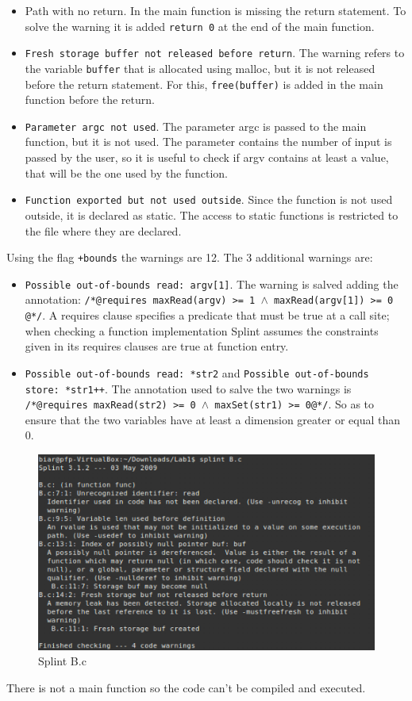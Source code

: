 \documentclass[a4paper]{article}
\begin{document}
\begin{itemize}
    \item \texttt{}{Path with no return}. In the main function is missing the return statement. To
        solve the warning it is added \texttt{return 0} at the end of the main function.

    \item \texttt{Fresh storage buffer not released before return}. The warning refers to the variable 
        \texttt{buffer} that is allocated using malloc, but it is not released before the return statement.
        For this, \texttt{free(buffer)} is added in the main function before the return.

    \item \texttt{Parameter argc not used}. The parameter argc is passed to the main function, but
        it is not used. The parameter contains the number of input is passed by the user, so it is useful
        to check if argv contains at least a value, that will be the one used by the function. 
    
    \item \texttt{Function exported but not used outside}. Since the function is not used outside, it
        is declared as static. The access to static functions is restricted to the file where they are declared.
\end{itemize}

Using the flag \texttt{+bounds} the warnings are 12. The 3 additional warnings are: 
\begin{itemize}
    \item \texttt{Possible out-of-bounds read: argv[1]}. The warning is salved adding the annotation: 
        \texttt{/*@requires maxRead(argv) >= 1 $\wedge$ maxRead(argv[1]) >= 0 @*/}. A requires clause specifies a predicate
        that must be true at a call site; when checking a function implementation Splint assumes the
        constraints given in its requires clauses are true at function entry.
    \item \texttt{Possible out-of-bounds read: *str2} and \texttt{Possible out-of-bounds store: *str1++}.
        The annotation used to salve the two warnings is \texttt{/*@requires maxRead(str2) >= 0 $\wedge$ maxSet(str1) >= 0@*/}. 
        So as to ensure that the two variables have at least a dimension greater or equal than 0.
\end{itemize}

\begin{figure}[h!]
    \centering
    \includegraphics[width=0.6\linewidth]{screen-B}
    \caption{Splint B.c}
\end{figure}
There is not a main function so the code can't be compiled and executed.
\end{document}

